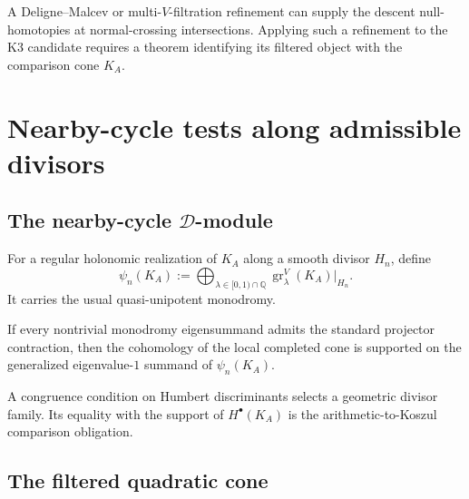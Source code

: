 \begin{remark}
\label{rem:pentachotomy-to-hexachotomy-bi-unipotent}
A Deligne--Malcev or multi-\(V\)-filtration refinement can supply the
descent null-homotopies at normal-crossing intersections.  Applying
such a refinement to the K3 candidate requires a theorem identifying
its filtered object with the comparison cone \(K_A\).
\end{remark}

\section{Nearby-cycle tests along admissible divisors}
\label{sec:tbsp-chain-level-nearby-cycle-admissible-Hn}

\subsection{The nearby-cycle \(\mathcal D\)-module}
\label{subsec:tbsp-nearby-cycle-D-module}

\begin{definition}
\label{def:tbsp-chain-nearby-cycle}
For a regular holonomic realization of \(K_A\) along a smooth divisor
\(H_n\), define
\[
 \psi_n(K_A)
 :=
 \bigoplus_{\lambda\in[0,1)\cap\mathbb Q}
 \operatorname{gr}^V_\lambda(K_A)|_{H_n}.
\]
It carries the usual quasi-unipotent monodromy.
\end{definition}

\begin{lemma}
\label{lem:tbsp-unipotent-part-controls}
If every nontrivial monodromy eigensummand admits the standard
projector contraction, then the cohomology of the local completed
cone is supported on the generalized eigenvalue-\(1\) summand of
\(\psi_n(K_A)\).
\end{lemma}

\begin{remark}
\label{rem:tbsp-why-admissibility}
A congruence condition on Humbert discriminants selects a geometric
divisor family.  Its equality with the support of
\(H^\bullet(K_A)\) is the arithmetic-to-Koszul comparison obligation.
\end{remark}

\subsection{The filtered quadratic cone}
\label{subsec:tbsp-koszul-bar-filtration}

